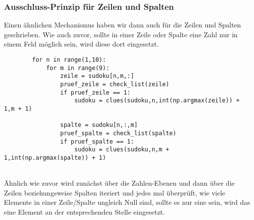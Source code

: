 \documentclass[11pt,a4paper]{article}
\begin{document}
\subsubsection{Ausschluss-Prinzip für Zeilen und Spalten}
Einen ähnlichen Mechanismus haben wir dann auch für die Zeilen und Spalten geschrieben. Wie auch zuvor, sollte in einer Zeile oder Spalte eine Zahl nur in einem Feld möglich sein, wird diese dort eingesetzt.
\ \\
\begin{verbatim}
        for n in range(1,10):  
            for m in range(9): 
                zeile = sudoku[n,m,:]  
                pruef_zeile = check_list(zeile) 
                if pruef_zeile == 1:      
                    sudoku = clues(sudoku,n,int(np.argmax(zeile)) + 1,m + 1)  
                    
                spalte = sudoku[n,:,m] 
                pruef_spalte = check_list(spalte)
                if pruef_spalte == 1:     
                    sudoku = clues(sudoku,n,m + 1,int(np.argmax(spalte)) + 1)               
\end{verbatim}
\ \\
Ähnlich wie zuvor wird zunächst über die Zahlen-Ebenen und dann über die Zeilen beziehungsweise Spalten iteriert und jedes mal überprüft, wie viele Elemente in einer Zeile/Spalte ungleich Null sind, sollte es nur eine sein, wird das eine Element an der entsprechenden Stelle eingesetzt.\\
\ \\
\end{document}
